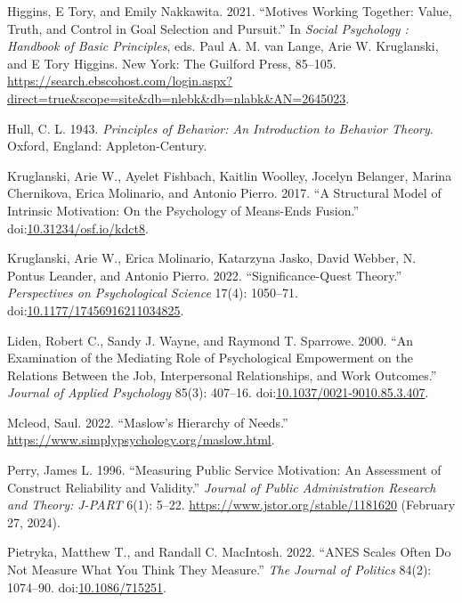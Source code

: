 \documentclass[
  11pt,
  a4paper,
]{article}
\newlength{\cslhangindent}
\newenvironment{CSLReferences}[2] %
 {\begin{list}{}{%
  \setlength{\itemindent}{0pt}
  \setlength{\leftmargin}{0pt}
  \setlength{\parsep}{0pt}
  \ifodd #1
   \setlength{\leftmargin}{\cslhangindent}
   \setlength{\itemindent}{-1\cslhangindent}
  \fi
  \setlength{\itemsep}{#2\baselineskip}}}
 {\end{list}}
\begin{document}
\begin{CSLReferences}{1}{1}
Higgins, E Tory, and Emily Nakkawita. 2021. {``Motives {Working
Together}: {Value}, {Truth}, and {Control} in {Goal Selection} and
{Pursuit}.''} In \emph{Social Psychology : Handbook of Basic
Principles}, eds. Paul A. M. van Lange, Arie W. Kruglanski, and E Tory
Higgins. New York: The Guilford Press, 85--105.
\url{https://search.ebscohost.com/login.aspx?direct=true&scope=site&db=nlebk&db=nlabk&AN=2645023}.

Hull, C. L. 1943. \emph{Principles of Behavior: An Introduction to
Behavior Theory}. Oxford, England: Appleton-Century.

Kruglanski, Arie W., Ayelet Fishbach, Kaitlin Woolley, Jocelyn Belanger,
Marina Chernikova, Erica Molinario, and Antonio Pierro. 2017. {``A
{Structural Model} of {Intrinsic Motivation}: {On} the {Psychology} of
{Means-Ends Fusion}.''}
doi:\href{https://doi.org/10.31234/osf.io/kdct8}{10.31234/osf.io/kdct8}.

Kruglanski, Arie W., Erica Molinario, Katarzyna Jasko, David Webber, N.
Pontus Leander, and Antonio Pierro. 2022. {``Significance-{Quest
Theory}.''} \emph{Perspectives on Psychological Science} 17(4):
1050--71.
doi:\href{https://doi.org/10.1177/17456916211034825}{10.1177/17456916211034825}.

Liden, Robert C., Sandy J. Wayne, and Raymond T. Sparrowe. 2000. {``An
Examination of the Mediating Role of Psychological Empowerment on the
Relations Between the Job, Interpersonal Relationships, and Work
Outcomes.''} \emph{Journal of Applied Psychology} 85(3): 407--16.
doi:\href{https://doi.org/10.1037/0021-9010.85.3.407}{10.1037/0021-9010.85.3.407}.

Mcleod, Saul. 2022. {``Maslow's Hierarchy of Needs.''}
\url{https://www.simplypsychology.org/maslow.html}.

Perry, James L. 1996. {``Measuring {Public Service Motivation}: {An
Assessment} of {Construct Reliability} and {Validity}.''} \emph{Journal
of Public Administration Research and Theory: J-PART} 6(1): 5--22.
\url{https://www.jstor.org/stable/1181620} (February 27, 2024).

Pietryka, Matthew T., and Randall C. MacIntosh. 2022. {``{ANES Scales
Often Do Not Measure What You Think They Measure}.''} \emph{The Journal
of Politics} 84(2): 1074--90.
doi:\href{https://doi.org/10.1086/715251}{10.1086/715251}.


\end{CSLReferences}
\end{document}
